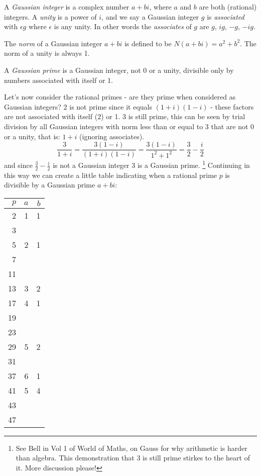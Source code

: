 \documentclass[a4paper]{article}
\begin{document}
A \emph{Gaussian integer} is a complex number $a + bi$, where $a$ and $b$ are both (rational) integers.
A \emph{unity} is a power of $i$, and we say a Gaussian integer $g$ is \emph{associated} with
$\epsilon g$ where $\epsilon$ is any unity. In other words the \emph{associates} of $g$ are
$g$, $ig$, $-g$, $-ig$.

The \emph{norm} of a Gaussian integer $a + bi$ is defined to be $N(a + bi) = a^{2} + b^{2}$.
The norm of a unity is always 1.

A \emph{Gaussian prime} is a Gaussian integer, not 0 or a unity, divisible only by numbers associated with itself or 1. 

Let's now consider the rational primes - are they prime when considered as Gaussian integers?
$2$ is not prime since it equals $(1 + i)(1 - i)$ - these factors are not associated with
itself ($2$) or 1. $3$ is still prime, this can be seen by trial division by all Gaussian integers
with norm less than or equal to 3 that are not 0 or a unity, that is: $1 + i$ (ignoring associates).
\begin{displaymath}
\frac{3}{1 + i} = \frac{3(1 - i)}{(1 + i)(1 - i)} = \frac{3(1 - i)}{1^{2} + 1^{2}}
= \frac{3}{2} - \frac{i}{2}
\end{displaymath}
and since $\frac{3}{2} - \frac{i}{2}$ is not a Gaussian integer $3$ is a Gaussian prime.
\footnote{See Bell in Vol 1 of World of Maths, on Gauss for why arithmetic is harder than algebra. This demonstration
that $3$ is still prime stirkes to the heart of it. More discussion please!}
Continuing in this way we can create a little table indicating when a rational prime $p$
is divisible by a Gaussian prime $a + bi$:

\begin{tabular}{rrr}
$p$ & $a$ & $b$ \\
\hline
2 & 1 & 1\\
3 \\
5 & 2 & 1\\
7 \\
11 \\
13 & 3 & 2\\
17 & 4 & 1\\
19 \\
23 \\
29 & 5 & 2\\
31 \\
37 & 6 & 1\\
41 & 5 & 4\\
43 \\
47 \\
\end{tabular}
\end{document}
